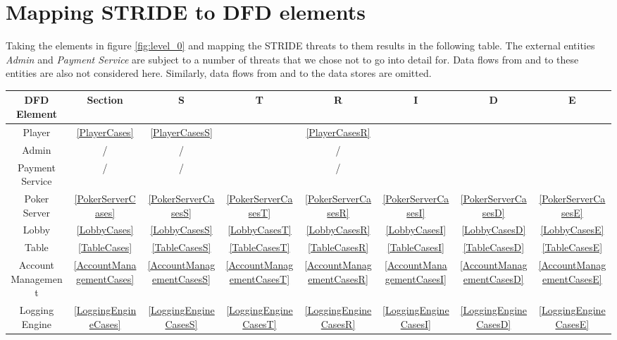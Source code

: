 \documentclass[a4paper,11pt]{report}
\begin{document}
\section{Mapping STRIDE to DFD elements}

Taking the elements in figure \ref{fig:level_0} and mapping the STRIDE threats to them results in the following table. The external entities \textit{Admin} and \textit{Payment Service} are subject to a number of threats that we chose not to go into detail for. Data flows from and to these entities are also not considered here. Similarly, data flows from and to the data stores are omitted.

\vspace{0.3cm}
\begin{center}
\begin{tabular}{| c || c || c | c | c | c | c | c |}
  \hline
  \textbf{DFD Element} 	& \textbf{Section}		& \textbf{S} 	& \textbf{T} 	& \textbf{R} 	& \textbf{I} 	& \textbf{D} 	& \textbf{E}	\\\hline
  \hline
  Player 		& \ref{PlayerCases}		& \ref{PlayerCasesS} 	& 	& \ref{PlayerCasesR} 		&  		&  		& 		\\\hline
  Admin 		& /			& / 		& 		& / 		&  		&  		& 		\\\hline
  Payment Service 	& /			& / 		& 		& / 		&  		&  		& 		\\\hline
  \hline
  Poker Server 		& \ref{PokerServerCases}	& \ref{PokerServerCasesS} 	& \ref{PokerServerCasesT}	& \ref{PokerServerCasesR} 	& \ref{PokerServerCasesI} 	& \ref{PokerServerCasesD} 	& \ref{PokerServerCasesE}	\\\hline
  Lobby 		& \ref{LobbyCases}		& \ref{LobbyCasesS} 	& \ref{LobbyCasesT}	& \ref{LobbyCasesR} 	& \ref{LobbyCasesI} 	& \ref{LobbyCasesD} 	& \ref{LobbyCasesE}	\\\hline
  Table 		& \ref{TableCases}		& \ref{TableCasesS} 	& \ref{TableCasesT}	& \ref{TableCasesR} 	& \ref{TableCasesI} 	& \ref{TableCasesD} 	& \ref{TableCasesE}	\\\hline
  Account Management 	& \ref{AccountManagementCases} 	& \ref{AccountManagementCasesS} 	& \ref{AccountManagementCasesT}	& \ref{AccountManagementCasesR} 	& \ref{AccountManagementCasesI} 	& \ref{AccountManagementCasesD} 	& \ref{AccountManagementCasesE}	\\\hline
  Logging Engine 	& \ref{LoggingEngineCases}	& \ref{LoggingEngineCasesS} 	& \ref{LoggingEngineCasesT}	& \ref{LoggingEngineCasesR} 	& \ref{LoggingEngineCasesI} 	& \ref{LoggingEngineCasesD} 	& \ref{LoggingEngineCasesE}	\\\hline

\end{tabular}
\end{center}
\end{document}
